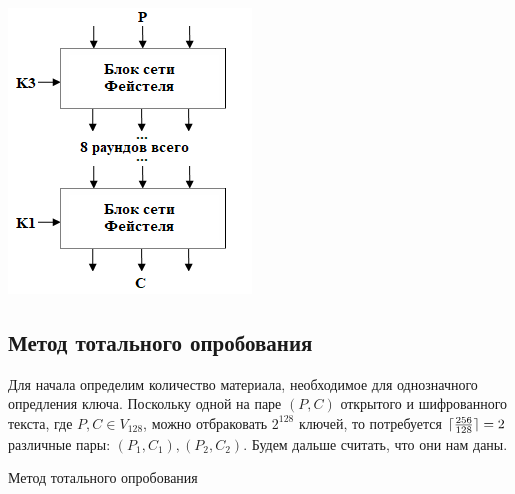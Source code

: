 \documentclass[a4paper,12pt]{article}
\DeclarePairedDelimiter{\ceil}{\lceil}{\rceil}
\newenvironment{Figure}
	{\par\medskip\noindent\minipage{\linewidth}}
	{\endminipage\par\medskip}
\begin{document}
\begin{multicols}{2}
        \begin{Figure}
			\centering
			\includegraphics[width=\linewidth]{cpiher.png}
		\end{Figure}			
	\end{multicols}

	\subsection*{Метод тотального опробования}
	
	Для начала определим количество материала, необходимое для однозначного опредления ключа. Поскольку одной на паре $(P, C)$ открытого и шифрованного текста, где $P, C \in V_{128}$, можно отбраковать $2^{128}$ ключей, то потребуется $\ceil{\frac{256}{128}} = 2$ различные пары: $(P_1, C_1), (P_2, C_2)$. Будем дальше считать, что они нам даны.
	
	
	\begin{algorithm}[H]
		
		\caption{Метод тотального опробования}
		\label{alg:Total}
		\SetAlgoNoEnd \SetAlgoNoLine 
		
		
	\end{algorithm}	
	
\end{document}
